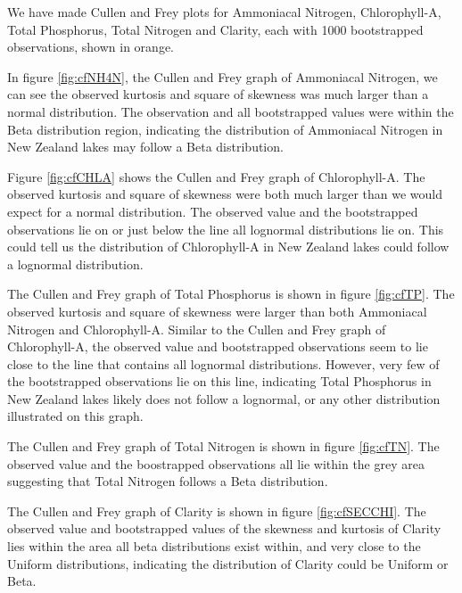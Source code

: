 \documentclass[
]{article}
\begin{document}
We have made Cullen and Frey plots for Ammoniacal Nitrogen, Chlorophyll-A, Total Phosphorus, Total Nitrogen and Clarity, each with 1000 bootstrapped observations, shown in orange.

In figure \ref{fig:cfNH4N}, the Cullen and Frey graph of Ammoniacal Nitrogen, we can see the observed kurtosis and square of skewness was much larger than a normal distribution. The observation and all bootstrapped values were within the Beta distribution region, indicating the distribution of Ammoniacal Nitrogen in New Zealand lakes may follow a Beta distribution.

Figure \ref{fig:cfCHLA} shows the Cullen and Frey graph of Chlorophyll-A. The observed kurtosis and square of skewness were both much larger than we would expect for a normal distribution. The observed value and the bootstrapped observations lie on or just below the line all lognormal distributions lie on. This could tell us the distribution of Chlorophyll-A in New Zealand lakes could follow a lognormal distribution.

The Cullen and Frey graph of Total Phosphorus is shown in figure \ref{fig:cfTP}. The observed kurtosis and square of skewness were larger than both Ammoniacal Nitrogen and Chlorophyll-A. Similar to the Cullen and Frey graph of Chlorophyll-A, the observed value and bootstrapped observations seem to lie close to the line that contains all lognormal distributions. However, very few of the bootstrapped observations lie on this line, indicating Total Phosphorus in New Zealand lakes likely does not follow a lognormal, or any other distribution illustrated on this graph.

The Cullen and Frey graph of Total Nitrogen is shown in figure \ref{fig:cfTN}. The observed value and the boostrapped observations all lie within the grey area suggesting that Total Nitrogen follows a Beta distribution.

The Cullen and Frey graph of Clarity is shown in figure \ref{fig:cfSECCHI}. The observed value and bootstrapped values of the skewness and kurtosis of Clarity lies within the area all beta distributions exist within, and very close to the Uniform distributions, indicating the distribution of Clarity could be Uniform or Beta.
\end{document}
